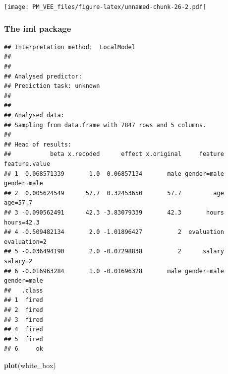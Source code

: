 \documentclass[]{krantz}
\newenvironment{Shaded}{\begin{snugshade}}{\end{snugshade}}
\newcommand{\DataTypeTok}[1]{\textcolor[rgb]{0.13,0.29,0.53}{#1}}
\newcommand{\DecValTok}[1]{\textcolor[rgb]{0.00,0.00,0.81}{#1}}
\newcommand{\KeywordTok}[1]{\textcolor[rgb]{0.13,0.29,0.53}{\textbf{#1}}}
\newcommand{\NormalTok}[1]{#1}
\newcommand{\OperatorTok}[1]{\textcolor[rgb]{0.81,0.36,0.00}{\textbf{#1}}}
\newcommand{\StringTok}[1]{\textcolor[rgb]{0.31,0.60,0.02}{#1}}
\theoremstyle{definition}
\theoremstyle{definition}
\theoremstyle{definition}
\theoremstyle{remark}
\begin{document}
\texttt{[image: PM\_VEE\_files/figure-latex/unnamed-chunk-26-2.pdf]}

\hypertarget{the-iml-package}{%
\subsubsection{\texorpdfstring{\textbf{The iml
package}}{The iml package}}\label{the-iml-package}}

\begin{Shaded}
\end{Shaded}

\begin{verbatim}
## Interpretation method:  LocalModel 
## 
## 
## Analysed predictor: 
## Prediction task: unknown 
## 
## 
## Analysed data:
## Sampling from data.frame with 7847 rows and 5 columns.
## 
## Head of results:
##           beta x.recoded      effect x.original     feature feature.value
## 1  0.068571339       1.0  0.06857134       male gender=male   gender=male
## 2  0.005624549      57.7  0.32453650       57.7         age      age=57.7
## 3 -0.090562491      42.3 -3.83079339       42.3       hours    hours=42.3
## 4 -0.509482134       2.0 -1.01896427          2  evaluation  evaluation=2
## 5 -0.036494190       2.0 -0.07298838          2      salary      salary=2
## 6 -0.016963284       1.0 -0.01696328       male gender=male   gender=male
##   .class
## 1  fired
## 2  fired
## 3  fired
## 4  fired
## 5  fired
## 6     ok
\end{verbatim}

\begin{Shaded}
\begin{Highlighting}[]
\KeywordTok{plot}\NormalTok{(white_box)}
\end{Highlighting}
\end{Shaded}
\end{document}
